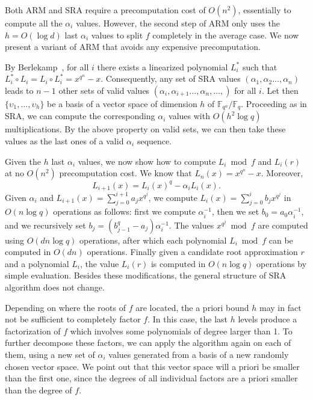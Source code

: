 \documentclass{sig-alternate}
\newcommand{\ff}[1]{\mathbb{F}_{#1}}
\newcommand{\fq}{\ff{q}}
\newcommand{\fqn}{\ff{q^n}}
\newcommand{\qq}{q}
\newcounter{algo}
\begin{document}
Both ARM and SRA require a precomputation cost of $O(n^2)$, essentially to compute all the $\alpha_i$ values. However, the second step of ARM only uses the $h=O(\log d)$ last $\alpha_i$ values  to split $f$ completely in the average case. We now present a variant of ARM that avoids any expensive precomputation.

By Berlekamp~\cite[Theorem..]{}, for all $i$ there exists a linearized polynomial $L_i^*$ such that $L_i^*\circ L_i=L_i\circ L_i^*=x^{q^n}-x$. Consequently, any set of SRA values $(\alpha_{1},\alpha_2\ldots,\alpha_{n})$ leads to $n-1$ other sets of valid values $(\alpha_{i},\alpha_{i+1}\ldots,\alpha_{n},\ldots,)$ for all $i$.
%
Let then $\{\upsilon_1,\ldots,\upsilon_h\}$ be a basis of a vector space of dimension $h$ of $\fqn/\fq$. Proceeding as in SRA, we can compute the corresponding $\alpha_i$ values with $O(h^2\log\qq)$ multiplications. By the above property on valid sets, we can then take these values as the last ones of a valid $\alpha_i$ sequence.

Given the $h$ last $\alpha_i$ values, we now show how to compute $L_i\bmod f$ and $L_i(r)$ at no $O(n^2)$ precomputation cost. We know that $L_n(x)=x^{q^n}-x$. Moreover,
$$L_{i+1}(x)=L_i(x)^q-\alpha_iL_i(x).$$
Given $\alpha_i$ and $L_{i+1}(x)=\sum_{j=0}^{i+1}a_jx^{q^j}$, we compute $L_i(x)=\sum_{j=0}^{i}b_jx^{q^j}$ in $O(n\log q)$ operations as follows: first we compute $\alpha_i^{-1}$, then we set $b_0=a_0\alpha_i^{-1}$, and we recursively set $b_j=(b_{j-1}^q-a_j)\alpha_i^{-1}$.
%
The values $x^{q^j}\bmod f$ are computed using $O(dn\log q)$ operations, after which each polynomial
$L_i\bmod f$ can be computed in $O(dn)$ operations.
%
Finally given a candidate root approximation $r$ and a polynomial $L_i$, the value $L_i(r)$ is computed in $O(n\log q)$ operations by simple evaluation. 
%
Besides these modifications, the general structure of SRA algorithm does not change.

Depending on where the roots of $f$ are located, the a priori bound $h$ may in fact not be sufficient to completely factor $f$. In this case, the last $h$ levels produce a factorization of $f$ which involves some polynomials of degree larger than 1. To further decompose these factors, we can apply the algorithm again on each of them, using a new set of $\alpha_i$ values generated from a basis of a new randomly chosen vector space. We point out that this vector space will a priori be smaller than the first one, since the degrees of all individual factors are a priori smaller than the degree of $f$.
\end{document}
